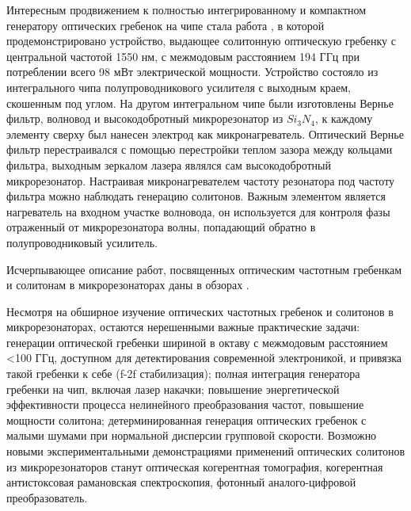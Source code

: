 Интересным продвижением к полностью интегрированному и компактном генератору оптических гребенок на чипе стала работа \cite{Stern2018}, в которой продемонстрировано устройство, выдающее солитонную оптическую гребенку с центральной частотой 1550 нм, с межмодовым расстоянием 194 ГГц при потреблении всего 98 мВт электрической мощности. Устройство состояло из интегрального чипа полупроводникового усилителя с выходным краем, скошенным под углом. На другом интегральном чипе были изготовлены Вернье фильтр, волновод и высокодобротный микрорезонатор из $Si_3N_4$, к каждому элементу сверху был нанесен электрод как микронагреватель. Оптический Вернье фильтр перестраивался с помощью перестройки теплом зазора между кольцами фильтра, выходным зеркалом лазера являлся сам высокодобротный микрорезонатор. Настраивая микронагревателем частоту резонатора под частоту фильтра можно наблюдать генерацию солитонов. Важным элементом является нагреватель на входном участке волновода, он используется для контроля фазы отраженный от микрорезонатора волны, попадающий обратно в полупроводниковый усилитель.

Исчерпывающее описание работ, посвященных оптическим частотным гребенкам и солитонам в микрорезонаторах даны в обзорах \cite{Kippenberg2011,ASavchenkov2016,ChemboY2016,PASQUAZI20181,Kippenbergeaan8083}.

Несмотря на обширное изучение оптических частотных гребенок и солитонов в микрорезонаторах, остаются нерешенными важные практические задачи: генерации оптической гребенки шириной в октаву с межмодовым расстоянием <100 ГГц, доступном для детектирования современной электроникой, и привязка такой гребенки к себе (f-2f стабилизация); полная интеграция генератора гребенки на чип, включая лазер накачки; повышение энергетической эффективности процесса нелинейного преобразования частот, повышение мощности солитона; детерминированная генерация оптических гребенок с малыми шумами при нормальной дисперсии групповой скорости. Возможно новыми экспериментальными демонстрациями применений оптических солитонов из микрорезонаторов станут оптическая когерентная томография, когерентная антистоксовая рамановская спектроскопия, фотонный аналого-цифровой преобразователь. 



